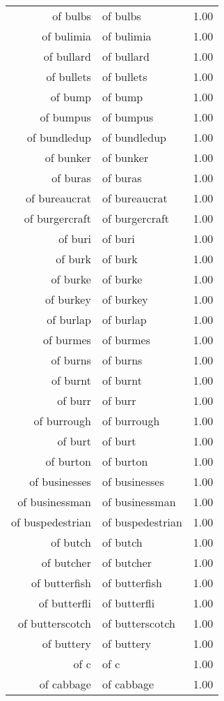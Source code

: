 \begin{table}[ht]
\begin{tabular}{rlr}
  of bulbs & of bulbs & 1.00 \\ 
  of bulimia & of bulimia & 1.00 \\ 
  of bullard & of bullard & 1.00 \\ 
  of bullets & of bullets & 1.00 \\ 
  of bump & of bump & 1.00 \\ 
  of bumpus & of bumpus & 1.00 \\ 
  of bundledup & of bundledup & 1.00 \\ 
  of bunker & of bunker & 1.00 \\ 
  of buras & of buras & 1.00 \\ 
  of bureaucrat & of bureaucrat & 1.00 \\ 
  of burgercraft & of burgercraft & 1.00 \\ 
  of buri & of buri & 1.00 \\ 
  of burk & of burk & 1.00 \\ 
  of burke & of burke & 1.00 \\ 
  of burkey & of burkey & 1.00 \\ 
  of burlap & of burlap & 1.00 \\ 
  of burmes & of burmes & 1.00 \\ 
  of burns & of burns & 1.00 \\ 
  of burnt & of burnt & 1.00 \\ 
  of burr & of burr & 1.00 \\ 
  of burrough & of burrough & 1.00 \\ 
  of burt & of burt & 1.00 \\ 
  of burton & of burton & 1.00 \\ 
  of businesses & of businesses & 1.00 \\ 
  of businessman & of businessman & 1.00 \\ 
  of buspedestrian & of buspedestrian & 1.00 \\ 
  of butch & of butch & 1.00 \\ 
  of butcher & of butcher & 1.00 \\ 
  of butterfish & of butterfish & 1.00 \\ 
  of butterfli & of butterfli & 1.00 \\ 
  of butterscotch & of butterscotch & 1.00 \\ 
  of buttery & of buttery & 1.00 \\ 
  of c & of c & 1.00 \\ 
  of cabbage & of cabbage & 1.00 \\ 

\end{tabular}
\end{table}
